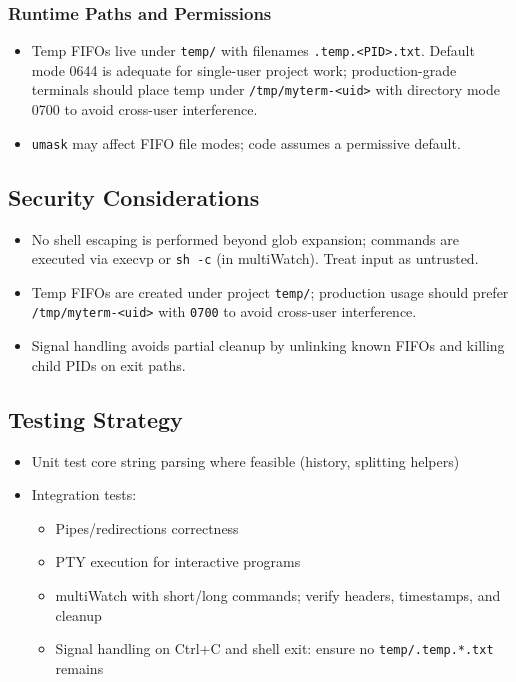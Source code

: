 \documentclass[11pt,a4paper]{article}
\begin{document}
\subsubsection{Runtime Paths and Permissions}
\begin{itemize}[leftmargin=*]
  \item Temp FIFOs live under \texttt{temp/} with filenames \texttt{.temp.<PID>.txt}. Default mode 0644 is adequate for single-user project work; production-grade terminals should place temp under \texttt{/tmp/myterm-<uid>} with directory mode 0700 to avoid cross-user interference.
  \item \texttt{umask} may affect FIFO file modes; code assumes a permissive default.
\end{itemize}

\subsection{Security Considerations}
\begin{itemize}[leftmargin=*]
  \item No shell escaping is performed beyond glob expansion; commands are executed via execvp or \texttt{sh -c} (in multiWatch). Treat input as untrusted.
  \item Temp FIFOs are created under project \texttt{temp/}; production usage should prefer \texttt{/tmp/myterm-<uid>} with \texttt{0700} to avoid cross-user interference.
  \item Signal handling avoids partial cleanup by unlinking known FIFOs and killing child PIDs on exit paths.
\end{itemize}

\subsection{Testing Strategy}
\begin{itemize}[leftmargin=*]
  \item Unit test core string parsing where feasible (history, splitting helpers)
  \item Integration tests:
    \begin{itemize}
      \item Pipes/redirections correctness
      \item PTY execution for interactive programs
      \item multiWatch with short/long commands; verify headers, timestamps, and cleanup
      \item Signal handling on Ctrl+C and shell exit: ensure no \texttt{temp/.temp.*.txt} remains
    \end{itemize}
\end{itemize}
\end{document}
